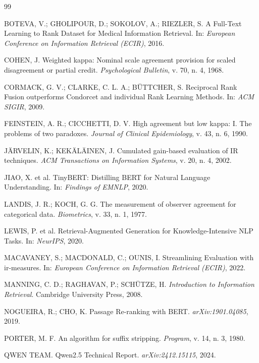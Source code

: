 \documentclass[11pt,a4paper]{article}
\begin{document}
\begin{thebibliography}{99}\small

 BOTEVA, V.; GHOLIPOUR, D.; SOKOLOV, A.; RIEZLER, S. A Full-Text Learning to Rank Dataset for Medical Information Retrieval. In: \emph{European Conference on Information Retrieval (ECIR)}, 2016.

 COHEN, J. Weighted kappa: Nominal scale agreement provision for scaled disagreement or partial credit. \emph{Psychological Bulletin}, v. 70, n. 4, 1968.

 CORMACK, G. V.; CLARKE, C. L. A.; BÜTTCHER, S. Reciprocal Rank Fusion outperforms Condorcet and individual Rank Learning Methods. In: \emph{ACM SIGIR}, 2009.

 FEINSTEIN, A. R.; CICCHETTI, D. V. High agreement but low kappa: I. The problems of two paradoxes. \emph{Journal of Clinical Epidemiology}, v. 43, n. 6, 1990.

 JÄRVELIN, K.; KEKÄLÄINEN, J. Cumulated gain-based evaluation of IR techniques. \emph{ACM Transactions on Information Systems}, v. 20, n. 4, 2002.

 JIAO, X. et al. TinyBERT: Distilling BERT for Natural Language Understanding. In: \emph{Findings of EMNLP}, 2020.

 LANDIS, J. R.; KOCH, G. G. The measurement of observer agreement for categorical data. \emph{Biometrics}, v. 33, n. 1, 1977.

 LEWIS, P. et al. Retrieval-Augmented Generation for Knowledge-Intensive NLP Tasks. In: \emph{NeurIPS}, 2020.

 MACAVANEY, S.; MACDONALD, C.; OUNIS, I. Streamlining Evaluation with ir-measures. In: \emph{European Conference on Information Retrieval (ECIR)}, 2022.

 MANNING, C. D.; RAGHAVAN, P.; SCHÜTZE, H. \emph{Introduction to Information Retrieval}. Cambridge University Press, 2008.

 NOGUEIRA, R.; CHO, K. Passage Re-ranking with BERT. \emph{arXiv:1901.04085}, 2019.

 PORTER, M. F. An algorithm for suffix stripping. \emph{Program}, v. 14, n. 3, 1980.

 QWEN TEAM. Qwen2.5 Technical Report. \emph{arXiv:2412.15115}, 2024.


\end{thebibliography}
\end{document}
